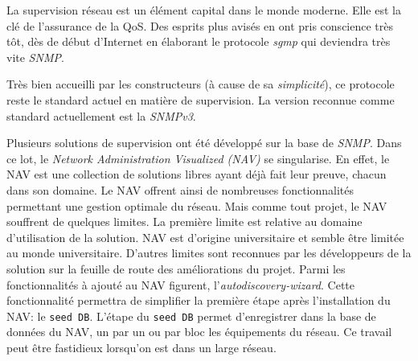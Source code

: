 \conclusion
La supervision réseau est un élément capital dans le monde moderne. Elle est la clé de l'assurance de la QoS. Des esprits plus avisés en ont pris conscience très tôt, dès de début d'Internet en élaborant le protocole \emph{\gls*{sgmp}} qui deviendra très vite \emph{SNMP}.

Très bien accueilli par les constructeurs (à cause de sa \emph{simplicité}), ce protocole reste le standard actuel en matière de supervision. La version reconnue comme standard actuellement est la \emph{SNMPv3}. 

Plusieurs solutions de supervision ont été développé sur la base de \emph{SNMP}. Dans ce lot, le \emph{Network Administration Visualized (NAV)} se singularise. En effet, le NAV est une collection de solutions libres ayant déjà fait leur preuve, chacun dans son domaine. Le NAV offrent ainsi de nombreuses fonctionnalités permettant une gestion optimale du réseau. Mais comme tout projet, le NAV souffrent de quelques limites. La première limite est relative au domaine d'utilisation de la solution. NAV est d'origine universitaire et semble être limitée au monde universitaire. D'autres limites sont reconnues par les développeurs de la solution sur la feuille de route des améliorations du projet. Parmi les fonctionnalités à ajouté au NAV figurent, l'\emph{autodiscovery-wizard}. Cette fonctionnalité permettra de simplifier la première étape après l'installation du NAV: le \texttt{seed DB}. L'étape  du \texttt{seed DB} permet d'enregistrer dans la base de données du NAV, un par un ou par bloc les équipements du réseau. Ce travail peut être fastidieux lorsqu'on est dans un large réseau. 

